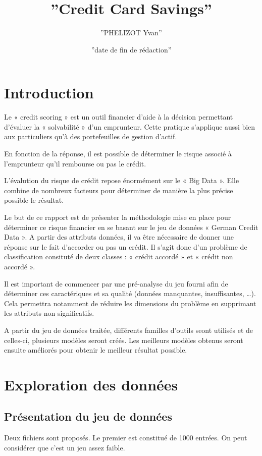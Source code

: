 \documentclass[a4paper, 11pt]{report}
\title{''Credit Card Savings''}
\author{''PHELIZOT Yvan''}
\date{''date de fin de rédaction''}
\begin{document}
\maketitle
\tableofcontents



\chapter*{Introduction}
Le « credit scoring » est un outil financier d’aide à la décision permettant d’évaluer la « solvabilité » d’un emprunteur. Cette pratique s’applique aussi bien aux particuliers qu’à des portefeuilles de gestion d’actif. 

En fonction de la réponse, il est possible de déterminer le risque associé à l’emprunteur qu’il rembourse ou pas le crédit. 

L’évalution du risque de crédit repose énormément sur le « Big Data ». Elle combine de nombreux facteurs pour déterminer de manière la plus précise possible le résultat.

Le but de ce rapport est de présenter la méthodologie mise en place pour déterminer ce risque financier en se basant sur le jeu de données « German Credit Data ». A partir des attributs données, il va être nécessaire de donner une réponse sur le fait d’accorder ou pas un crédit. Il s’agit donc d’un problème de classification consituté de deux classes : « crédit accordé » et « crédit non accordé ».

Il est important de commencer par une pré-analyse du jeu fourni afin de déterminer ces caractériques et sa qualité (données manquantes, insuffisantes, …). Cela permettra notamment de réduire les dimensions du problème en supprimant les attributs non significatifs.

A partir du jeu de données traitée, différents familles d’outils seont utilisés et de celles-ci, plusieurs modèles seront créés. Les meilleurs modèles obtenus seront ensuite améliorés pour obtenir le meilleur résultat possible.

\chapter{Exploration des données}
\section{Présentation du jeu de données}
Deux fichiers sont proposés. Le premier est constitué de 1000 entrées. On peut considérer que c’est un jeu assez faible.
\end{document}
